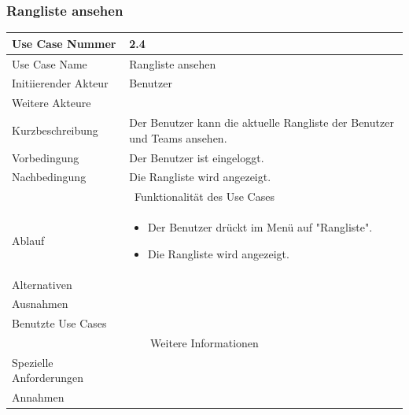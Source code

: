 \documentclass[10pt,a4paper]{article}
\begin{document}
\subsubsection{Rangliste ansehen}
	\begin{tabularx}{\textwidth}{|l|X|}
	\hline Use Case Nummer & 2.4 \\ 
	\hline Use Case Name & Rangliste ansehen\\ 
	\hline Initiierender Akteur & Benutzer \\
	\hline Weitere Akteure &  \\
	\hline Kurzbeschreibung & Der Benutzer kann die aktuelle Rangliste der Benutzer und Teams ansehen. \\
	\hline Vorbedingung & Der Benutzer ist eingeloggt. \\
	\hline Nachbedingung & Die Rangliste wird angezeigt. \\
	\hline \multicolumn{2}{|c|}{Funktionalität des Use Cases}\\
	\hline Ablauf & \begin{itemize}
		\item Der Benutzer drückt im Menü auf "Rangliste".
		\item Die Rangliste wird angezeigt.
	\end{itemize} \\
	\hline Alternativen &  \\
	\hline Ausnahmen &  \\
	\hline Benutzte Use Cases &  \\
	\hline \multicolumn{2}{|c|}{Weitere Informationen} \\
	\hline Spezielle Anforderungen &  \\
	\hline Annahmen &  \\
	\hline
	\end{tabularx}
\end{document}

